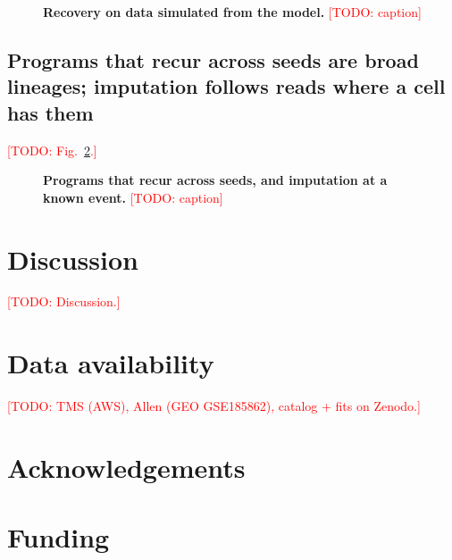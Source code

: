 \documentclass[webpdf,traditional,large,namedate]{oup-authoring-template}
\let\cite\citep
\newcommand{\todo}[1]{\textcolor{red}{[TODO: #1]}}
\begin{document}
\begin{figure}[!t]
\centering
\caption{\textbf{Recovery on data simulated from the model.} \todo{caption}}
\label{fig:3}
\end{figure}

\subsection{Programs that recur across seeds are broad lineages; imputation follows reads where a cell has them}
\todo{Fig.~\ref{fig:4}.}

\begin{figure}[!t]
\centering
\caption{\textbf{Programs that recur across seeds, and imputation at a known event.} \todo{caption}}
\label{fig:4}
\end{figure}

\section{Discussion}
\todo{Discussion.}

\section{Data availability}
\todo{TMS (AWS), Allen (GEO GSE185862), catalog + fits on Zenodo.}

\section{Acknowledgements}
\section{Funding}



\end{document}
